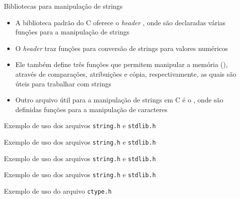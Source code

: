 \begin{frame}[fragile]{Bibliotecas para manipulação de strings}

    \begin{itemize}
        \item A biblioteca padrão do C oferece o \textit{header} , onde são 
            declaradas várias funções para a manipulação de strings

        \item O \textit{header}  traz funções para conversão de strings para 
            valores numéricos

        \item Ele também define três funções que permitem manipular a memória 
        (), através de comparações, atribuições e cópia, 
            respectivamente, as quais são úteis para trabalhar com strings

        \item Outro arquivo útil para a manipulação de strings em C é o , onde 
            são definidas funções para a manipulação de caracteres
    \end{itemize}

\end{frame}

\begin{frame}[fragile]{Exemplo de uso dos arquivos \texttt{string.h} e \texttt{stdlib.h}}
\end{frame}

\begin{frame}[fragile]{Exemplo de uso dos arquivos \texttt{string.h} e \texttt{stdlib.h}}
\end{frame}

\begin{frame}[fragile]{Exemplo de uso dos arquivos \texttt{string.h} e \texttt{stdlib.h}}
\end{frame}

\begin{frame}[fragile]{Exemplo de uso dos arquivos \texttt{string.h} e \texttt{stdlib.h}}
\end{frame}

\begin{frame}[fragile]{Exemplo de uso do arquivo \texttt{ctype.h}}
\end{frame}
